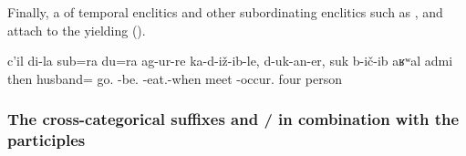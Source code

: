 Finally, a  of temporal enclitics and other subordinating enclitics such as   ,   and   attach to the  yielding  ().


\begin{exe}
	\ex	\label{ex:Then my husband and I were sitting and when we were eating we met four men.}
	\gll	c'il	di-la		sub=ra		du=ra		ag-ur-re			ka-d-iž-ib-le,		d-uk-an-er,	suk	b-ič-ib			aʁʷal	admi\\
		then		husband=		go.	-be.	-eat.-when		meet	-occur.	four	person\\
	\glt	{}
\end{exe}




\subsubsection{The cross-categorical suffixes  and \slash{} in combination with the participles}
\label{sssec:The attributive markers -il and -ce / -te in combination with the participles}

